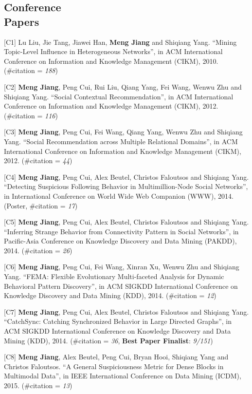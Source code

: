 \documentclass[margin, 10pt]{res}
\begin{document}
\begin{resume}
\section{Conference \\ Papers}

[C1] Lu Liu, Jie Tang, Jiawei Han, {\bf Meng Jiang} and Shiqiang Yang. ``Mining Topic-Level Influence in Heterogeneous Networks'', in ACM International Conference on Information and Knowledge Management (CIKM), 2010. (\#citation = {\em 188})

[C2] {\bf Meng Jiang}, Peng Cui, Rui Liu, Qiang Yang, Fei Wang, Wenwu Zhu and Shiqiang Yang. ``Social Contextual Recommendation'', in ACM International Conference on Information and Knowledge Management (CIKM), 2012. (\#citation = {\em 116})

[C3] {\bf Meng Jiang}, Peng Cui, Fei Wang, Qiang Yang, Wenwu Zhu and Shiqiang Yang. ``Social Recommendation across Multiple Relational Domains'', in ACM International Conference on Information and Knowledge Management (CIKM), 2012. (\#citation = {\em 44})

[C4] {\bf Meng Jiang}, Peng Cui, Alex Beutel, Christos Faloutsos and Shiqiang Yang. ``Detecting Suspicious Following Behavior in Multimillion-Node Social Networks'', in International Conference on World Wide Web Companion (WWW), 2014. (Poster, \#citation = {\em 17})

[C5] {\bf Meng Jiang}, Peng Cui, Alex Beutel, Christos Faloutsos and Shiqiang Yang. ``Inferring Strange Behavior from Connectivity Pattern in Social Networks'', in Pacific-Asia Conference on Knowledge Discovery and Data Mining (PAKDD), 2014. (\#citation = {\em 26})

[C6] {\bf Meng Jiang}, Peng Cui, Fei Wang, Xinran Xu, Wenwu Zhu and Shiqiang Yang. ``FEMA: Flexible Evolutionary Multi-faceted Analysis for Dynamic Behavioral Pattern Discovery'', in ACM SIGKDD International Conference on Knowledge Discovery and Data Mining (KDD), 2014. (\#citation = {\em 12})

[C7] {\bf Meng Jiang}, Peng Cui, Alex Beutel, Christos Faloutsos and Shiqiang Yang. ``CatchSync: Catching Synchronized Behavior in Large Directed Graphs'', in ACM SIGKDD International Conference on Knowledge Discovery and Data Mining (KDD), 2014. (\#citation = {\em 36}, {\bf Best Paper Finalist}: {\em 9/151})

[C8] {\bf Meng Jiang}, Alex Beutel, Peng Cui, Bryan Hooi, Shiqiang Yang and Christos Faloutsos. ``A General Suspiciousness Metric for Dense Blocks in Multimodal Data'', in IEEE International Conference on Data Mining (ICDM), 2015. (\#citation = {\em 13})


\end{resume}
\end{document}
